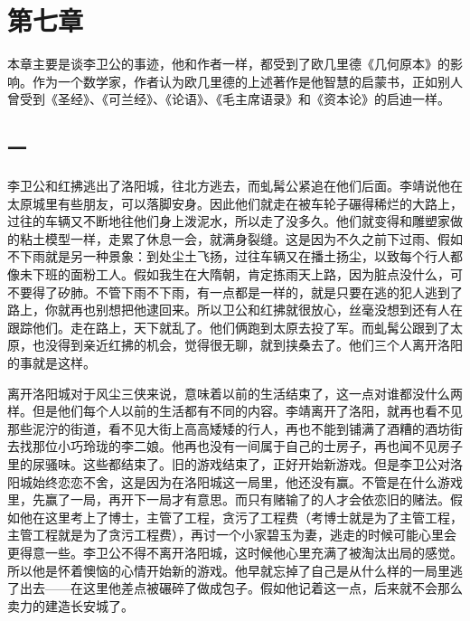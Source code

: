 \section{第七章} 

本章主要是谈李卫公的事迹，他和作者一样，都受到了欧几里德《几何原本》的影响。作为一个数学家，作者认为欧几里德的上述著作是他智慧的启蒙书，正如别人曾受到《圣经》、《可兰经》、《论语》、《毛主席语录》和《资本论》的启迪一样。 

\subsection{一} 

李卫公和红拂逃出了洛阳城，往北方逃去，而虬髯公紧追在他们后面。李靖说他在太原城里有些朋友，可以落脚安身。因此他们就走在被车轮子碾得稀烂的大路上，过往的车辆又不断地往他们身上泼泥水，所以走了没多久。他们就变得和雕塑家做的粘土模型一样，走累了休息一会，就满身裂缝。这是因为不久之前下过雨、假如不下雨就是另一种景象：到处尘土飞扬，过往车辆又在播土扬尘，以致每个行人都像未下班的面粉工人。假如我生在大隋朝，肯定拣雨天上路，因为脏点没什么，可不要得了矽肺。不管下雨不下雨，有一点都是一样的，就是只要在逃的犯人逃到了路上，你就再也别想把他逮回来。所以卫公和红拂就很放心，丝毫没想到还有人在跟踪他们。走在路上，天下就乱了。他们俩跑到太原去投了军。而虬髯公跟到了太原，也没得到亲近红拂的机会，觉得很无聊，就到挟桑去了。他们三个人离开洛阳的事就是这样。 

离开洛阳城对于风尘三侠来说，意味着以前的生活结束了，这一点对谁都没什么两样。但是他们每个人以前的生活都有不同的内容。李靖离开了洛阳，就再也看不见那些泥泞的街道，看不见大街上高高矮矮的行人，再也不能到铺满了酒糟的酒坊街去找那位小巧玲珑的李二娘。他再也没有一间属于自己的士房子，再也闻不见房子里的尿骚味。这些都结束了。旧的游戏结束了，正好开始新游戏。但是李卫公对洛阳城始终恋恋不舍，这是因为在洛阳城这一局里，他还没有赢。不管是在什么游戏里，先赢了一局，再开下一局才有意思。而只有赌输了的人才会依恋旧的赌法。假如他在这里考上了博士，主管了工程，贪污了工程费（考博士就是为了主管工程，主管工程就是为了贪污工程费），再讨一个小家碧玉为妻，逃走的时候可能心里会更得意一些。李卫公不得不离开洛阳城，这时候他心里充满了被淘汰出局的感觉。所以他是怀着懊恼的心情开始新的游戏。他早就忘掉了自己是从什么样的一局里逃了出去——在这里他差点被碾碎了做成包子。假如他记着这一点，后来就不会那么卖力的建造长安城了。 


